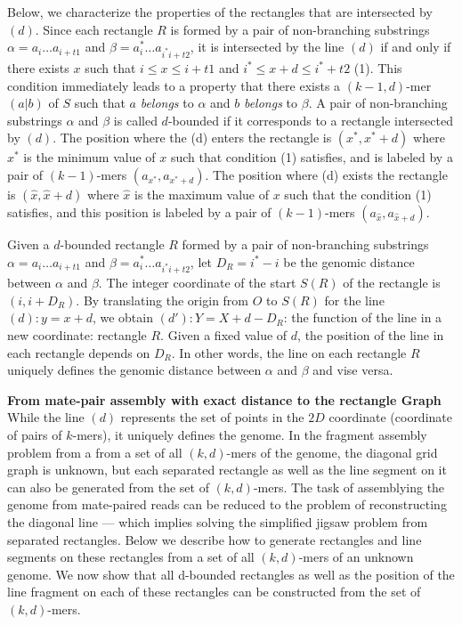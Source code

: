 \documentclass[a4paper]{article}
\begin{document}
Below, we characterize the properties of the rectangles that are intersected by $(d)$. 
Since each rectangle $R$ is formed by a pair of non-branching substrings $\alpha = a_i\ldots a_{i+t1}$
and $\beta = a_i^*\ldots a_{i^*i+ t2}$, it is intersected by the line $(d)$ if and only if 
there exists $x$ such that $i\leq x \leq i+t1$ and $ i^* \leq x + d \leq i^* + t2$ (1). This condition
immediately leads to a property that there exists a $(k-1,d)$-mer $(a|b)$ of $S$ such that 
$a$ \emph{belongs} to $\alpha$ and $b$ \emph{belongs} to $\beta$.  A pair 
of non-branching substrings $\alpha$ and $\beta$ is called $d$-bounded if it corresponds to 
a rectangle intersected by $(d)$. The position where the (d) enters the rectangle is $(x^*,x^*+d)$ where 
$x^*$ is the minimum value  of $x$ such that condition (1) satisfies, and is labeled by 
a pair of $(k-1)$-mers $(a_{x^*}, a_{x^*+d})$.  The position where (d) exists 
the rectangle is $(\hat{x}, \hat{x}+d)$ where $\hat{x}$ is the maximum value of $x$ such that the condition
(1) satisfies, and this position is labeled by a pair of $(k-1)$-mers $(a_{\hat{x}}, a_{\hat{x} +d})$.


Given a $d$-bounded rectangle $R$ formed by a pair of non-branching substrings $\alpha = a_i\ldots a_{i+t1}$
and $\beta = a_i^*\ldots a_{i^*i+ t2}$, let $D_R= i^* - i$ be the genomic distance between $\alpha$ and $\beta$. The integer 
coordinate of the start $S(R)$ of the rectangle is $(i, i + D_R)$. By translating the origin from  $O$ to $S(R)$ for the line
$(d): y = x + d$, we obtain $(d'): Y = X + d - D_R$: the function of the line in a new coordinate: rectangle $R$. Given a fixed
value of $d$, the position of the line in each rectangle depends on $D_R$. In other words, the line on each rectangle $R$ 
uniquely defines the genomic distance between $\alpha$ and $\beta$ and vise versa. 


\noindent
\textbf{From mate-pair assembly with exact distance to the rectangle Graph}
While the line $(d)$ represents the 
set of points in the $2D$ coordinate (coordinate of pairs of $k$-mers), it uniquely defines the genome.
In the fragment assembly problem from a from a set of all $(k,d)$-mers of the genome, 
the diagonal grid graph is unknown, but each separated rectangle as well 
as the line segment on it can also be generated
from the set of $(k,d)$-mers. The task of assemblying the genome from mate-paired reads can be 
reduced to the problem of reconstructing the diagonal line --- which implies solving the simplified jigsaw problem from separated rectangles. Below we describe how
to generate rectangles and line segments on these rectangles from a set of all $(k,d)$-mers of an unknown genome. We now 
show that all d-bounded rectangles as well as the position of the line fragment on each of these rectangles can be constructed from 
the set of $(k,d)$-mers. 
\end{document}
